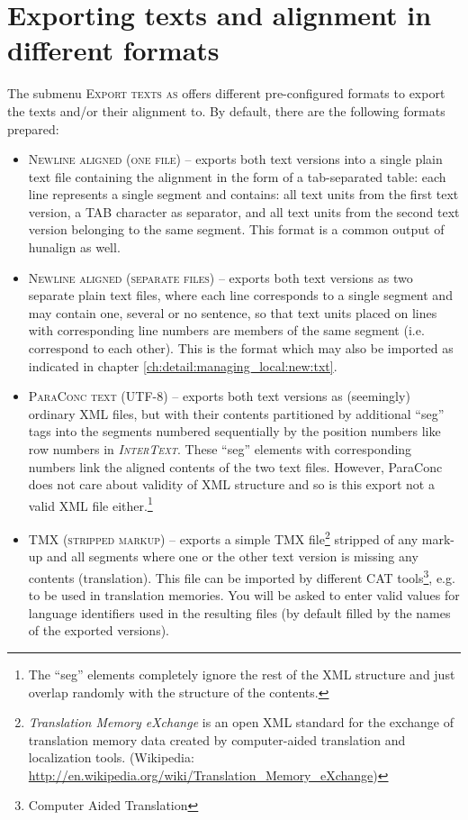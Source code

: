 \documentclass[a4paper,10pt,oneside]{book}
\newcommand{\IT}{\textit{\textsc{InterText}}\xspace}
\newcommand{\menu}[1]{\textsc{#1}}
\begin{document}
\section{Exporting texts and alignment in different formats}\label{ch:detail:managing_local:export_texts}

The submenu \menu{Export texts as} offers different pre-configured formats to export the texts and/or their alignment to. By default, there are the following formats prepared:

\begin{itemize}
 \item \menu{Newline aligned (one file)} -- exports both text versions into a single plain text file containing the alignment in the form of a tab-separated table: each line represents a single segment and contains: all text units from the first text version, a TAB character as separator, and all text units from the second text version belonging to the same segment. This format is a common output of hunalign as well.
 \item \menu{Newline aligned (separate files)} -- exports both text versions as two separate plain text files, where each line corresponds to a single segment and may contain one, several or no sentence, so that text units placed on lines with corresponding line numbers are members of the same segment (i.e. correspond to each other). This is the format which may also be imported as indicated in chapter \ref{ch:detail:managing_local:new:txt}.
 \item \menu{ParaConc text (UTF-8)} -- exports both text versions as (seemingly) ordinary XML files, but with their contents partitioned by additional ``seg'' tags into the segments numbered sequentially by the position numbers like row numbers in \IT. These ``seg'' elements with corresponding numbers link the aligned contents of the two text files. However, ParaConc does not care about validity of XML structure and so is this export not a valid XML file either.\footnote{The ``seg'' elements completely ignore the rest of the XML structure and just overlap randomly with the structure of the contents.}
 \item \menu{TMX (stripped markup)} -- exports a simple TMX file\footnote{\emph{Translation Memory eXchange} is an open XML standard for the exchange of translation memory data created by computer-aided translation and localization tools. (Wikipedia: \url{http://en.wikipedia.org/wiki/Translation_Memory_eXchange})} stripped of any mark-up and all segments where one or the other text version is missing any contents (translation). This file can be imported by different CAT tools\footnote{Computer Aided Translation}, e.g. to be used in translation memories. You will be asked to enter valid values for language identifiers used in the resulting files (by default filled by the names of the exported versions).
\end{itemize}
\end{document}
